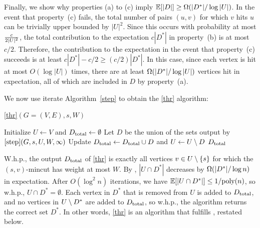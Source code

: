 Finally, we show why properties (a) to (c) imply $\mathbb E[|D|] \ge \Omega(|D^*|/\log|U|)$. In the event that property~(c) fails, the total number of pairs $(u,v)$ for which $v$ hits $u$ can be trivially upper bounded by $|U|^2$. Since this occurs with probability at most $\frac c{2|U|^2}$, the total contribution to the expectation $c|D^*|$ in property~(b) is at most $c/2$. Therefore, the contribution to the expectation in the event that property~(c) succeeds is at least $c|D^*|-c/2\ge (c/2)|D^*|$. In this case, since each vertex is hit at most $O(\log|U|)$ times, there are at least $\Omega(|D^*|/\log|U|)$ vertices hit in expectation, all of which are included in $D$ by property~(a).
\EP


We now use iterate Algorithm~\ref{step} to obtain the \ref{thr} algorithm:

\begin{algorithm}
\caption{\ref{thr}$(G=(V,E),s, W)$}
\begin{algorithmic}[1]
\State Initialize $U\gets V$ and $D_{\textup{total}}\gets\emptyset$
 \State Let $D$ be the union of the sets output by $\ref{step}(G,s,U, W,\infty)$
 \State Update $D_{\textup{total}}\gets D_{\textup{total}}\cup D$ and $U\gets U\setminus D$
\EndFor
\State\Return $D_{\textup{total}}$
\end{algorithmic}
\end{algorithm}


\BC{}
W.h.p., the output $D_{\textup{total}}$ of \ref{thr} is exactly all vertices $v\in U\setminus \{s\}$ for which the $(s,v)$-mincut has weight at most $ W$. 
\EC
\BP
By , $|U\cap D^*|$ decreases by $\Omega(|D^*|/\log n)$ in expectation. After $O(\log^2n)$ iterations, we have $\mathbb E[|U\cap D^*|] \le 1/\textup{poly}(n)$, so w.h.p., $U\cap D^*=\emptyset$. Each vertex in $D^*$ that is removed from $U$ is added to $D_{\textup{total}}$, and no vertices in $U\setminus D^*$ are added to $D_{\textup{total}}$, so w.h.p., the algorithm returns the correct set $D^*$.
\EP
In other words, \ref{thr} is an algorithm that fulfills , restated below.
\Thr*


